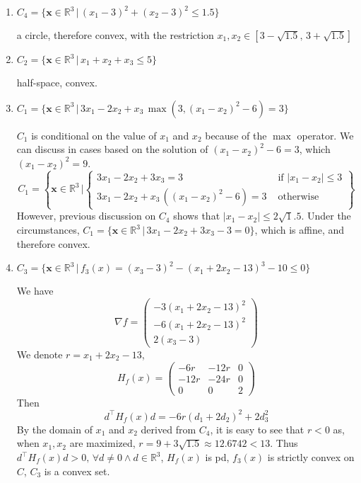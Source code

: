 \begin{enumerate}
\item $C_4 = \{\mathbf{x} \in \mathbb{R}^3\,|\,(x_1 - 3)^2 + (x_2 - 3)^2 \leq 1.5\}$
\par a circle, therefore convex, with the restriction $x_1, x_2 \in [3 - \sqrt{1.5},\, 3 + \sqrt{1.5}]$
\item $C_2 = \{\mathbf{x} \in \mathbb{R}^3\,|\,x_1+x_2+x_3 \leq 5\}$
\par half-space, convex.
\item $C_1 = \{\mathbf{x} \in \mathbb{R}^3\,|\, 3x_1 - 2x_2 + x_3\,\max(3, (x_1 - x_2)^2 - 6) = 3\}$
\par $C_1$ is conditional on the value of $x_1$ and $x_2$ because of the $\max$ operator. We can discuss in cases based on the solution of $(x_1 - x_2)^2 - 6 = 3$, which $(x_1 - x_2)^2 = 9$.
\[
C_1 = \left\{\mathbf{x} \in \mathbb{R}^3\,|
\begin{cases}
3x_1 - 2x_2 + 3x_3 = 3 &\text{ if }  |x_1 - x_2| \leq 3 \\
3x_1 - 2x_2 + x_3\,((x_1 - x_2)^2 - 6) = 3 &\text{ otherwise}
\end{cases}
\right\}
\]
However, previous discussion on $C_4$ shows that $|x_1 - x_2| \leq 2\sqrt 1.5$. Under the circumstances, $C_1 = \{\mathbf{x} \in \mathbb{R}^3\,|\, 3x_1 - 2x_2 + 3x_3 - 3= 0\}$, which is affine, and therefore convex.

\item $C_3 = \{\mathbf{x} \in \mathbb{R}^3\,|\, f_3(x) = (x_3 - 3)^2 - (x_1 + 2x_2 - 13)^3 - 10 \leq 0\}$
\par We have 
\[
\nabla f = \left(\begin{array}{c}
     -3(x_1 + 2x_2 - 13)^2 \\
     -6(x_1 + 2x_2 - 13)^2 \\
     2 (x_3 - 3)
\end{array}
\right)
\]
We denote $r = x_1 + 2x_2 - 13$, 
\[
H_f(x) = \left(\begin{array}{ccc}
     -6r & -12r & 0 \\
     -12r & -24r & 0 \\
     0 & 0 & 2
\end{array}
\right)
\]
Then \[
d^\intercal H_f(x) d = -6r(d_1 + 2d_2)^2 + 2d_3^2
\]
By the domain of $x_1$ and $x_2$ derived from $C_4$, it is easy to see that $r < 0$ as, when $x_1,x_2$ are maximized, $r = 9 + 3 \sqrt{1.5} \approx 12.6742 < 13$. Thus $d^\intercal H_f(x)d > 0,\,\forall d \neq 0 \land d \in \mathbb{R}^3$, $H_f(x)$ is pd, $f_3(x)$ is strictly convex on $C$, $C_3$ is a convex set. 
\end{enumerate}

